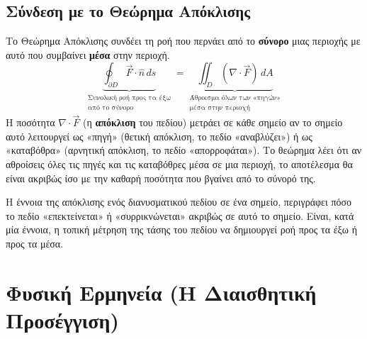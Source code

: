 \documentclass[a4paper,12pt,twoside]{article}
\begin{document}
\subsection*{Σύνδεση με το Θεώρημα Απόκλισης}
Το Θεώρημα Απόκλισης συνδέει τη ροή που περνάει από το \textbf{σύνορο} μιας περιοχής με αυτό που συμβαίνει \textbf{μέσα} στην περιοχή.
\[ \underbrace{\oint_{\partial D} \vec{F} \cdot \hat{n} \, ds}_{\substack{\text{Συνολική ροή προς τα έξω} \\ \text{από το σύνορο}}} = \underbrace{\iint_D (\nabla \cdot \vec{F}) \, dA}_{\substack{\text{Άθροισμα όλων των «πηγών»} \\ \text{μέσα στην περιοχή}}} \]
Η ποσότητα $\nabla \cdot \vec{F}$ (η \textbf{απόκλιση} του πεδίου) μετράει σε κάθε σημείο αν το σημείο αυτό λειτουργεί ως «πηγή» (θετική απόκλιση, το πεδίο «αναβλύζει») ή ως «καταβόθρα» (αρνητική απόκλιση, το πεδίο «απορροφάται»). Το θεώρημα λέει ότι αν αθροίσεις όλες τις πηγές και τις καταβόθρες μέσα σε μια περιοχή, το αποτέλεσμα θα είναι ακριβώς ίσο με την καθαρή ποσότητα που βγαίνει από το σύνορό της.

\begin{center}
\end{center}
\newpage
Η έννοια της απόκλισης ενός διανυσματικού πεδίου σε ένα σημείο, περιγράφει πόσο το πεδίο «επεκτείνεται» ή «συρρικνώνεται» ακριβώς σε αυτό το σημείο. Είναι, κατά μία έννοια, η τοπική μέτρηση της τάσης του πεδίου να δημιουργεί ροή προς τα έξω ή προς τα μέσα.

\section{Φυσική Ερμηνεία (Η Διαισθητική Προσέγγιση)}
\end{document}
